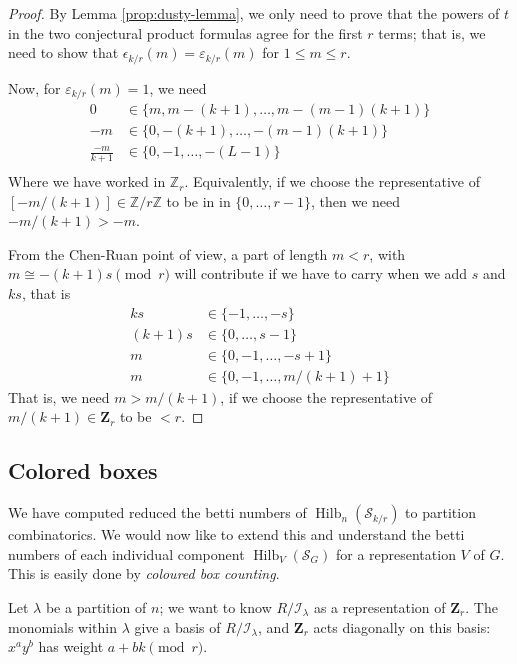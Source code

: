 \documentclass{amsart}[12pt]
\theoremstyle{definition}
\newcommand{\Z}{\mathbf{Z}}
\newcommand{\II}{\mathcal{I}}
\newcommand{\Sur}{\mathcal{S}}
\DeclareMathOperator{\Hilb}{Hilb}
\begin{document}
\begin{proof}
By Lemma \ref{prop:dusty-lemma}, we only need to prove that the powers of $t$ in the two conjectural product formulas agree for the first $r$ terms; that is, we need to show that $\epsilon_{k/r}(m)=\varepsilon_{k/r}(m)$ for $1\leq m\leq r$.  

Now, for $\varepsilon_{k/r}(m)=1$, we need 
\begin{align*}
0 &\in \{m, m-(k+1),\dots, m-(m-1)(k+1) \} \\
-m &\in \{0, -(k+1),\dots,-(m-1)(k+1) \} \\
\frac{-m}{k+1} &\in \{0, -1, \dots, -(L-1) \} \\
\end{align*}
Where we have worked in $\mathbb{Z}_r$.  Equivalently, if we choose the representative of $[-m/(k+1)]\in \mathbb{Z}/r\mathbb{Z}$ to be in in $\{0,\dots, r-1\}$, then we need $-m/(k+1)>-m$.

From the Chen-Ruan point of view, a part of length $m<r$, with $ m\cong-(k+1)s\pmod r$ will contribute if we have to carry when we add $s$ and $ks$, that is 
\begin{align*}
k s &\in\{ -1,\dots, -s \}\\
(k+1)s &\in\{ 0,\dots, s-1\} \\
m&\in\{ 0,-1,\dots, -s+1\} \\
m& \in \{0, -1,\dots, m/(k+1)+1\}
\end{align*}
That is, we need $m>m/(k+1)$, if we choose the representative of $m/(k+1)\in\Z_r$ to be $<r$.

\end{proof}






\subsection{Colored boxes}

We have computed reduced the betti numbers of $\Hilb_n(\Sur_{k/r})$ to partition combinatorics.  We would now like to extend this and understand the betti numbers of each individual component $\Hilb_V(\Sur_G)$ for a representation $V$ of $G$.  This is easily done by \emph{coloured box counting}.

Let $\lambda$ be a partition of $n$; we want to know $R/\II_\lambda$ as a representation of $\Z_r$.  The monomials within $\lambda$ give a basis of $R/\II_\lambda$, and $\Z_r$ acts diagonally on this basis: $x^ay^b$ has weight $a+bk\pmod r$.
\end{document}
